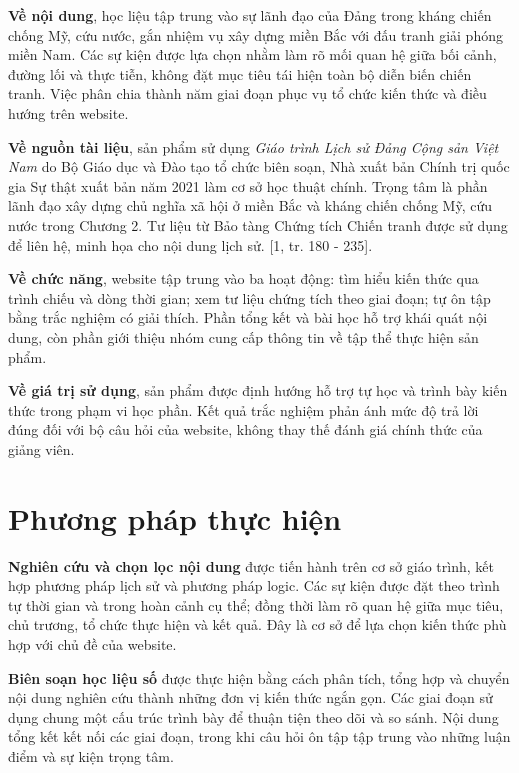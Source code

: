 \textbf{Về nội dung}, học liệu tập trung vào sự lãnh đạo của Đảng trong kháng chiến chống Mỹ, cứu nước, gắn nhiệm vụ xây dựng miền Bắc với đấu tranh giải phóng miền Nam. Các sự kiện được lựa chọn nhằm làm rõ mối quan hệ giữa bối cảnh, đường lối và thực tiễn, không đặt mục tiêu tái hiện toàn bộ diễn biến chiến tranh. Việc phân chia thành năm giai đoạn phục vụ tổ chức kiến thức và điều hướng trên website.

\textbf{Về nguồn tài liệu}, sản phẩm sử dụng \emph{Giáo trình Lịch sử Đảng Cộng sản Việt Nam} do Bộ Giáo dục và Đào tạo tổ chức biên soạn, Nhà xuất bản Chính trị quốc gia Sự thật xuất bản năm 2021 làm cơ sở học thuật chính. Trọng tâm là phần lãnh đạo xây dựng chủ nghĩa xã hội ở miền Bắc và kháng chiến chống Mỹ, cứu nước trong Chương 2. Tư liệu từ Bảo tàng Chứng tích Chiến tranh được sử dụng để liên hệ, minh họa cho nội dung lịch sử. [1, tr. 180 - 235].

\textbf{Về chức năng}, website tập trung vào ba hoạt động: tìm hiểu kiến thức qua trình chiếu và dòng thời gian; xem tư liệu chứng tích theo giai đoạn; tự ôn tập bằng trắc nghiệm có giải thích. Phần tổng kết và bài học hỗ trợ khái quát nội dung, còn phần giới thiệu nhóm cung cấp thông tin về tập thể thực hiện sản phẩm.

\textbf{Về giá trị sử dụng}, sản phẩm được định hướng hỗ trợ tự học và trình bày kiến thức trong phạm vi học phần. Kết quả trắc nghiệm phản ánh mức độ trả lời đúng đối với bộ câu hỏi của website, không thay thế đánh giá chính thức của giảng viên.

\section{Phương pháp thực hiện}

\textbf{Nghiên cứu và chọn lọc nội dung} được tiến hành trên cơ sở giáo trình, kết hợp phương pháp lịch sử và phương pháp logic. Các sự kiện được đặt theo trình tự thời gian và trong hoàn cảnh cụ thể; đồng thời làm rõ quan hệ giữa mục tiêu, chủ trương, tổ chức thực hiện và kết quả. Đây là cơ sở để lựa chọn kiến thức phù hợp với chủ đề của website.

\textbf{Biên soạn học liệu số} được thực hiện bằng cách phân tích, tổng hợp và chuyển nội dung nghiên cứu thành những đơn vị kiến thức ngắn gọn. Các giai đoạn sử dụng chung một cấu trúc trình bày để thuận tiện theo dõi và so sánh. Nội dung tổng kết kết nối các giai đoạn, trong khi câu hỏi ôn tập tập trung vào những luận điểm và sự kiện trọng tâm.

